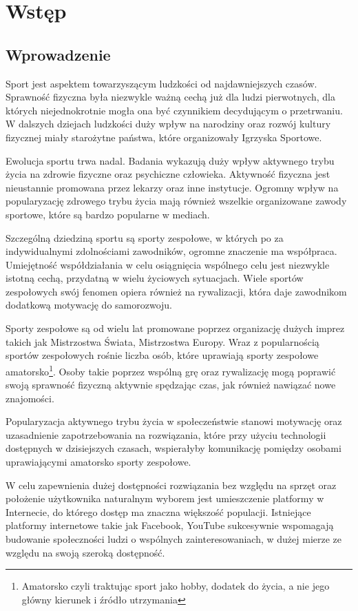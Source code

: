 \chapter{Wstęp}
\section{Wprowadzenie}

Sport jest aspektem towarzyszącym ludzkości od najdawniejszych czasów. Sprawność fizyczna była niezwykle ważną cechą już dla ludzi pierwotnych, dla których niejednokrotnie mogła ona być czynnikiem decydującym o przetrwaniu. W dalszych dziejach ludzkości duży wpływ na narodziny oraz rozwój kultury fizycznej miały starożytne państwa, które organizowały Igrzyska Sportowe.

Ewolucja sportu trwa nadal. Badania wykazują duży wpływ aktywnego trybu życia na zdrowie fizyczne oraz psychiczne człowieka. Aktywność fizyczna jest nieustannie promowana przez lekarzy oraz inne instytucje. Ogromny wpływ na popularyzację zdrowego trybu życia mają również wszelkie organizowane zawody sportowe, które są bardzo popularne w mediach.

Szczególną dziedziną sportu są sporty zespołowe, w których po za indywidualnymi zdolnościami zawodników, ogromne znaczenie ma współpraca. Umiejętność współdziałania w celu osiągnięcia wspólnego celu jest niezwykle istotną cechą, przydatną w wielu życiowych sytuacjach. Wiele sportów zespołowych swój fenomen opiera również na rywalizacji, która daje zawodnikom dodatkową motywację do samorozwoju.

Sporty zespołowe są od wielu lat promowane poprzez organizację dużych imprez takich jak Mistrzostwa Świata, Mistrzostwa Europy. Wraz z popularnością sportów zespołowych rośnie liczba osób, które uprawiają sporty zespołowe amatorsko\footnote{Amatorsko czyli traktując sport jako hobby, dodatek do życia, a nie jego główny kierunek i źródło utrzymania}. Osoby takie poprzez wspólną grę oraz rywalizację mogą poprawić swoją sprawność fizyczną aktywnie spędzając czas, jak również nawiązać nowe znajomości.

Popularyzacja aktywnego trybu życia w społeczeństwie stanowi motywację oraz uzasadnienie zapotrzebowania na rozwiązania, które przy użyciu technologii dostępnych w dzisiejszych czasach, wspierałyby komunikację pomiędzy osobami uprawiającymi amatorsko sporty zespołowe. 

W celu zapewnienia dużej dostępności rozwiązania bez względu na sprzęt oraz położenie użytkownika naturalnym wyborem jest umieszczenie platformy w Internecie, do którego dostęp ma znaczna większość populacji. Istniejące platformy internetowe takie jak Facebook, YouTube sukcesywnie wspomagają budowanie społeczności ludzi o wspólnych zainteresowaniach, w dużej mierze ze względu na swoją szeroką dostępność.

